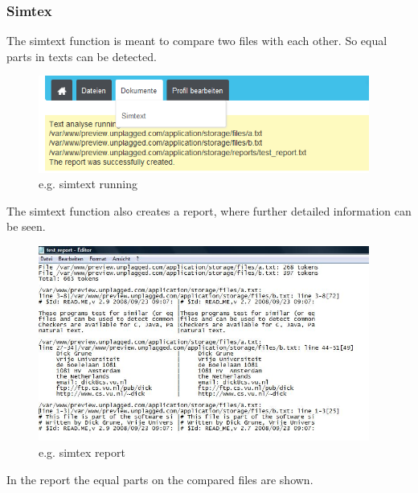 \subsubsection{Simtex}
The simtext function is meant to compare two files with each other. So equal parts in texts can be detected.
\begin{figure}[!ht]
  \centering
    \includegraphics[width=0.97\textwidth]{images/basic_functionalities/simtext_running.png}
  \caption{e.g. simtext running}
  \label{fig: simtext running}
\end{figure}
The simtext function also creates a report, where further detailed information can be seen.
\begin{figure}[!ht]
  \centering
    \includegraphics[width=0.97\textwidth]{images/basic_functionalities/simtext_report.jpg}
  \caption{e.g. simtex report}
  \label{fig:e.g. simtex report}
\end{figure}
In the report the equal parts on the compared files are shown.
